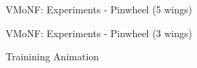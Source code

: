\documentclass{beamer}
\begin{document}
\begin{frame}{VMoNF: Experiments - Pinwheel (5 wings)}
\protect\hypertarget{vmonf-experiments---pinwheel-5-wings}{}

\centering
{}
\hfill
{}

\end{frame}

\begin{frame}{VMoNF: Experiments - Pinwheel (3 wings)}
\protect\hypertarget{vmonf-experiments---pinwheel-3-wings}{}

Trainining Animation

\end{frame}
\end{document}
